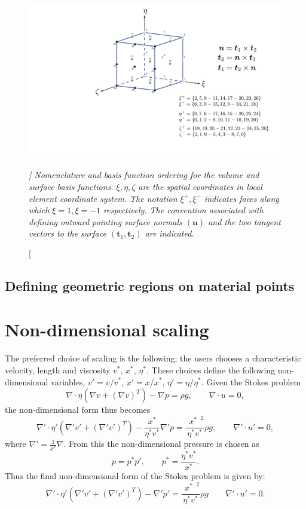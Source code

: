 \documentclass[paper=a4, fontsize=11pt,twoside]{scrartcl}
\begin{document}
{{\begin{figure} [hbtp]
\center
\includegraphics[height=0.4\textheight]{figs/pt3d_basis_functions.pdf}
\caption[\itshape ]
{\itshape Nomenclature and basis function ordering for the volume and surface basis functions. $\xi, \eta, \zeta$ are the spatial coordinates in local element coordinate system. The notation $\xi^{+}, \xi^{-}$ indicates faces along which $\xi = 1, \xi = -1$ respectively. The convention associated with defining outward pointing surface normals $(\boldsymbol n)$ and the two tangent vectors to the surface $(\boldsymbol t_1,\boldsymbol t_2)$ are indicated.}
\label{fig:basis_functions}
\end{figure}

\subsection{Defining geometric regions on material points}

\section{Non-dimensional scaling}
The preferred choice of scaling is the following; the users chooses a characteristic velocity, length and viscosity $v^*$, $x^*$, $\eta^*$.
These choices define the following non-dimensional variables, $v' = v/v^*$, $x' = x/x^*$, $\eta' = \eta/\eta^*$. Given the Stokes problem
$$
	\nabla \cdot \eta \left( \nabla v + (\nabla v)^T \right) - \nabla p = \rho g,
	\qquad
	\nabla \cdot u = 0,
$$
the non-dimensional form thus becomes
$$
	\nabla' \cdot \eta' \left( \nabla' v' + (\nabla' v')^T \right) - \frac{x^*}{\eta^* v^*} \nabla' p = \frac{\phantom(x^*\phantom)^2}{\eta^* v^*} \rho g,
	\qquad
	\nabla' \cdot u' = 0,
$$
where $\nabla' = \frac{1}{x^*} \nabla$.
From this the non-dimensional pressure is chosen as 
$$
	p = p^* p', \qquad p^* = \frac{\eta^* v^*}{x^*} .
$$
Thus the final non-dimensional form of the Stokes problem is given by:
$$
	\nabla' \cdot \eta' \left( \nabla' v' + (\nabla' v')^T \right) - \nabla' p' 
	= \frac{\phantom(x^*\phantom)^2}{\eta^* v^*} \rho g
	\qquad
	\nabla' \cdot u' = 0.
$$

}}
\end{document}
